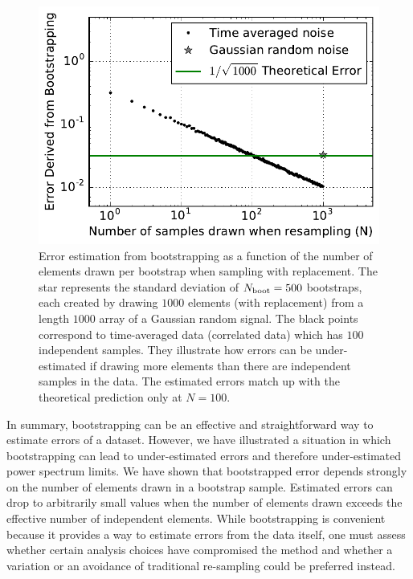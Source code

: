 \documentclass[preprint2,numberedappendix,tighten]{aastex6}  %
\begin{document}
\begin{figure}
	\centering
	\includegraphics[trim={0cm 0cm 0cm 0cm},width=\columnwidth]{plots/toy_error1.pdf}
	\caption{Error estimation from bootstrapping as a function of the number of elements drawn per bootstrap when 
sampling with replacement. The star represents the standard deviation of $N_{\rm boot}=500$ bootstraps, each created by drawing $1000$ 
elements (with replacement) from a length $1000$ array of a Gaussian random signal. The black points correspond to time-averaged data (correlated data) which has $100$ independent samples. They illustrate how errors can be under-estimated if 
drawing more elements than there are independent samples in the data. The estimated errors match up with the theoretical 
prediction only at $N=100$.}
	\label{fig:toy_error1}
\end{figure}

In summary, bootstrapping can be an effective and straightforward way to estimate errors of a dataset. However, we have 
illustrated a situation in which bootstrapping can lead to under-estimated errors and therefore under-estimated power spectrum limits. We have shown that 
bootstrapped error depends strongly on the number of elements drawn in a bootstrap sample. Estimated errors can drop to 
arbitrarily small values when the number of elements drawn exceeds the effective number of independent elements. 
While bootstrapping is convenient because it provides a way to estimate errors from the data itself, one must assess whether certain 
analysis choices have compromised the method and whether a variation or an avoidance of traditional re-sampling could be preferred instead.
\end{document}
